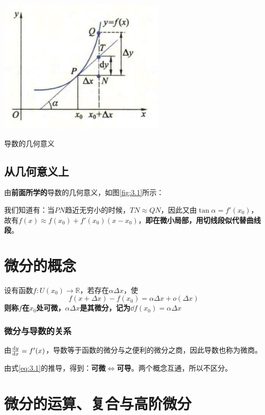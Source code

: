 \begin{marginfigure}[1em]
	\includegraphics[width=\marginparwidth]{figures/导数的几何意义}
	\caption{导数的几何意义}
	\label{fig:3.1}
\end{marginfigure}

\subsection{从几何意义上}

由\textbf{前面所学的}导数的几何意义，如图\ref{fig:3.1}所示：

我们知道有：当$PN$趋近无穷小的时候，$TN\approx QN$，因此又由$\tan\alpha=f'(x_0)$，故有$f(x)\approx f(x_0)+f'(x_0)(x-x_0)$，\textbf{即在微小局部，用切线段似代替曲线段}。



\section{微分的概念}

\begin{definition}
	设有函数$f:U(x_0)\rightarrow \mathbb{R}$，若存在$\alpha \Delta x$，使$$f(x+\Delta x)-f(x_0)=\alpha\Delta x+o(\Delta x)$$
	\textbf{则称$f$在$x_0$处可微，$\alpha \Delta x$是其微分，记为$\dd f(x_0)=\alpha\Delta x$}
\end{definition}

\subsubsection{微分与导数的关系}

由$\dv{y}{x} = f'(x)$，导数等于函数的微分与之便利的微分之商，因此导数也称为微商。

由式\ref{eq:3.1}的推导，得到：\textbf{可微$\Leftrightarrow$可导}。两个概念互通，所以不区分。

\section{微分的运算、复合与高阶微分}\label{sec:3.3}

